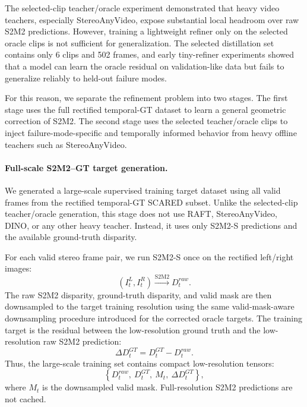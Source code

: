 \documentclass[11pt,a4paper]{article}
\begin{document}
The selected-clip teacher/oracle experiment demonstrated that heavy video
teachers, especially StereoAnyVideo, expose substantial local headroom over raw
S2M2 predictions. However, training a lightweight refiner only on the selected
oracle clips is not sufficient for generalization. The selected distillation set
contains only 6 clips and 502 frames, and early tiny-refiner experiments showed
that a model can learn the oracle residual on validation-like data but fails to
generalize reliably to held-out failure modes.

For this reason, we separate the refinement problem into two stages. The first
stage uses the full rectified temporal-GT dataset to learn a general geometric
correction of S2M2. The second stage uses the selected teacher/oracle clips to
inject failure-mode-specific and temporally informed behavior from heavy offline
teachers such as StereoAnyVideo.

\paragraph{Full-scale S2M2--GT target generation.}
We generated a large-scale supervised training target dataset using all valid
frames from the rectified temporal-GT SCARED subset. Unlike the selected-clip
teacher/oracle generation, this stage does not use RAFT, StereoAnyVideo, DINO, or
any other heavy teacher. Instead, it uses only S2M2-S predictions and the
available ground-truth disparity.

For each valid stereo frame pair, we run S2M2-S once on the rectified left/right
images:
\[
(I_t^L, I_t^R) \xrightarrow{\mathrm{S2M2}} D_t^{raw}.
\]
The raw S2M2 disparity, ground-truth disparity, and valid mask are then
downsampled to the target training resolution using the same valid-mask-aware
downsampling procedure introduced for the corrected oracle targets. The training
target is the residual between the low-resolution ground truth and the
low-resolution raw S2M2 prediction:
\[
\Delta D_t^{GT} = D_t^{GT} - D_t^{raw}.
\]
Thus, the large-scale training set contains compact low-resolution tensors:
\[
\left\{
D_t^{raw},\ D_t^{GT},\ M_t,\ \Delta D_t^{GT}
\right\},
\]
where \(M_t\) is the downsampled valid mask. Full-resolution S2M2 predictions are
not cached.
\end{document}
